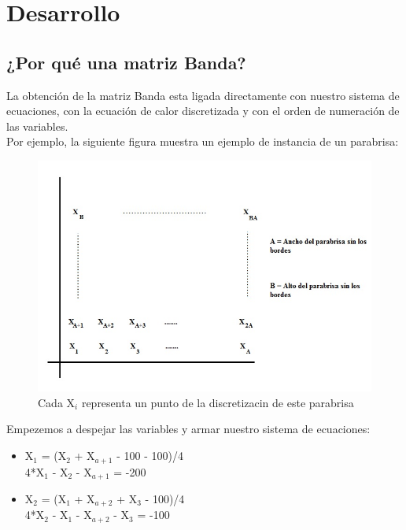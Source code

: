 \section{Desarrollo}

\subsection{¿Por qué una matriz Banda?}
La obtención de la matriz Banda esta ligada directamente con nuestro sistema de ecuaciones, con la ecuación de calor discretizada y con el orden de numeración de las variables. \\
Por ejemplo, la siguiente figura  muestra un ejemplo de instancia de un parabrisa:

    \begin{figure}[H]
    \centering
    \includegraphics[scale=0.7]{graphs/mapa.jpg}\caption{Cada X$_i$ representa un punto de la discretizacin de este parabrisa}
      \end{figure}
      
      
      
Empezemos a despejar las variables y armar nuestro sistema de ecuaciones:\\
    \begin{itemize}
    \item  X$_1$ = (X$_2$ + X$_{a+1}$ - 100 - 100)/4\\
            4*X$_1$ - X$_2$ - X$_{a+1}$ = -200 
            
    \item X$_2$ = (X$_1$ + X$_{a+2}$ + X$_3$ - 100)/4\\
            4*X$_2$ - X$_1$ - X$_{a+2}$ - X$_3$ = -100 
    
    \end{itemize}
    

